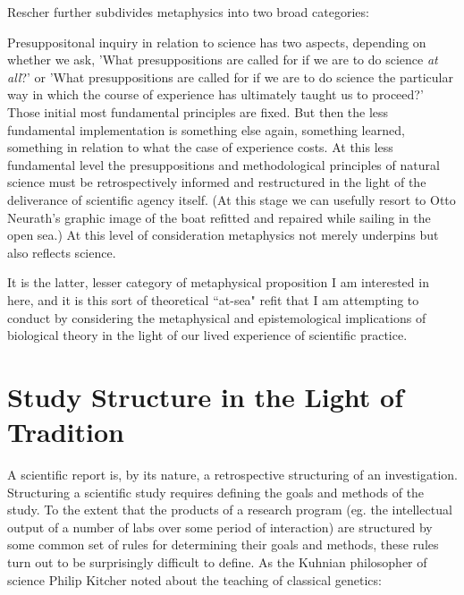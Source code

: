 Rescher further subdivides metaphysics into two broad categories:

\begin{longquote}
Presuppositonal inquiry in relation to science has two aspects, depending on whether we ask, 'What presuppositions are called for if we are to do science \textit{at all}?' or 'What presuppositions are called for if we are to do science the particular way in which the course of experience has ultimately taught us to proceed?' Those initial most fundamental principles are fixed. But then the less fundamental implementation is something else again, something learned, something in relation to what the case of experience costs. At this less fundamental level the presuppositions and methodological principles of natural science must be retrospectively informed and restructured in the light of the deliverance of scientific agency itself. (At this stage we can usefully resort to Otto Neurath's graphic image of the boat refitted and repaired while sailing in the open sea.) At this level of consideration metaphysics not merely underpins but also reflects science. \cite[p.5]{Rescher2000}
\end{longquote}

It is the latter, lesser category of metaphysical proposition I am interested in here, and it is this sort of theoretical ``at-sea" refit that I am attempting to conduct by considering the metaphysical and epistemological implications of biological theory in the light of our lived experience of scientific practice.
 
\section{Study Structure in the Light of Tradition}

A scientific report is, by its nature, a retrospective structuring of an investigation. Structuring a scientific study requires defining the goals and methods of the study. To the extent that the products of a research program (eg. the intellectual output of a number of labs over some period of interaction) are structured by some common set of rules for determining their goals and methods, these rules turn out to be surprisingly difficult to define. As the Kuhnian philosopher of science Philip Kitcher noted about the teaching of classical genetics:

